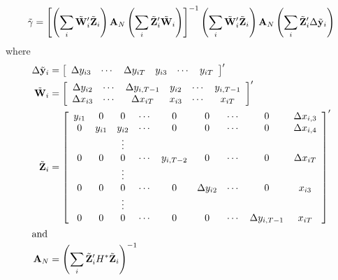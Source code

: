 \begin{equation}
\label{eq:sys-gmm}
  \tilde{\gamma} = \left[ 
    \left( \sum_i \tilde{\mathbf{W}}_i'\tilde{\mathbf{Z}}_i \right) \mathbf{A}_N
    \left( \sum_i \tilde{\mathbf{Z}}_i'\tilde{\mathbf{W}}_i \right) \right]^{-1} 
    \left( \sum_i \tilde{\mathbf{W}}_i'\tilde{\mathbf{Z}}_i \right) \mathbf{A}_N
    \left( \sum_i \tilde{\mathbf{Z}}_i'\Delta \tilde{\mathbf{y}}_i \right)
\end{equation}
where
\begin{align*}
  \Delta \tilde{\mathbf{y}}_i  & =
     \left[ \begin{array}{ccccccc}
         \Delta y_{i3} & \cdots & \Delta y_{iT} & y_{i3} & \cdots & y_{iT}
       \end{array} \right]' \\
  \tilde{\mathbf{W}}_i  & =
     \left[ \begin{array}{cccccc}
         \Delta y_{i2} & \cdots & \Delta y_{i,T-1} & y_{i2} & \cdots & y_{i,T-1} \\
         \Delta x_{i3} & \cdots & \Delta x_{iT}  & x_{i3} & \cdots & x_{iT} \\
       \end{array} \right]' \\
  \tilde{\mathbf{Z}}_i  & =
     \left[ \begin{array}{ccccccccc}
         y_{i1} & 0 & 0       & \cdots & 0  & 0  & \cdots & 0 & \Delta x_{i,3}\\
         0 & y_{i1} & y_{i2} & \cdots & 0  & 0  & \cdots & 0 & \Delta x_{i,4}\\
         & & \vdots \\
         0 & 0 & 0 & \cdots & y_{i, T-2} & 0  & \cdots & 0  & \Delta x_{iT}\\
         & & \vdots \\
         0 & 0 & 0 & \cdots & 0 & \Delta y_{i2} & \cdots & 0  & x_{i3}\\
         & & \vdots \\
         0 & 0 & 0 & \cdots & 0 & 0 & \cdots & \Delta y_{i,T-1}  & x_{iT}\\
       \end{array} \right]' \\
  \intertext{and}
  \mathbf{A}_N & = \left( \sum_i \tilde{\mathbf{Z}}_i' H^* \tilde{\mathbf{Z}}_i \right)^{-1}
\end{align*}

